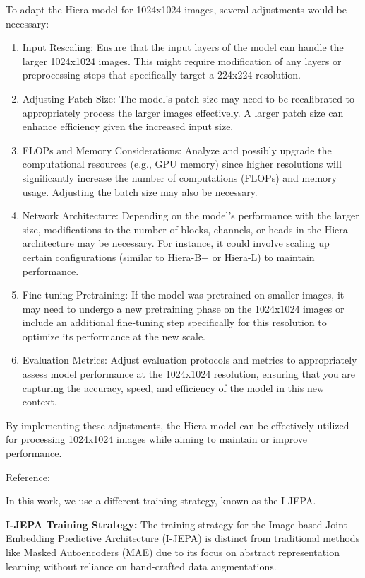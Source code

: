 \documentclass{article} %
\begin{document}
To adapt the Hiera model for 1024x1024 images, several adjustments would be necessary:
\begin{enumerate}
   \item Input Rescaling: Ensure that the input layers of the model can handle the larger 1024x1024 images. This might require modification of any layers or preprocessing steps that specifically target a 224x224 resolution.
   \item Adjusting Patch Size: The model's patch size may need to be recalibrated to appropriately process the larger images effectively. A larger patch size can enhance efficiency given the increased input size.
   \item FLOPs and Memory Considerations: Analyze and possibly upgrade the computational resources (e.g., GPU memory) since higher resolutions will significantly increase the number of computations (FLOPs) and memory usage. Adjusting the batch size may also be necessary.
   \item Network Architecture: Depending on the model's performance with the larger size, modifications to the number of blocks, channels, or heads in the Hiera architecture may be necessary. For instance, it could involve scaling up certain configurations (similar to Hiera-B+ or Hiera-L) to maintain performance.
   \item Fine-tuning Pretraining: If the model was pretrained on smaller images, it may need to undergo a new pretraining phase on the 1024x1024 images or include an additional fine-tuning step specifically for this resolution to optimize its performance at the new scale.
   \item Evaluation Metrics: Adjust evaluation protocols and metrics to appropriately assess model performance at the 1024x1024 resolution, ensuring that you are capturing the accuracy, speed, and efficiency of the model in this new context.
\end{enumerate}

By implementing these adjustments, the Hiera model can be effectively utilized for processing 1024x1024 images while aiming to maintain or improve performance.

Reference: \cite[Hiera Model]{ryali2023hiera}

In this work, we use a different training strategy, known as the I-JEPA.

{\bf I-JEPA Training Strategy:}
The training strategy for the Image-based Joint-Embedding Predictive Architecture (I-JEPA) is distinct from traditional methods like Masked Autoencoders (MAE) due to its focus on abstract representation learning without reliance on hand-crafted data augmentations.
\end{document}
